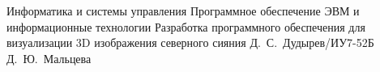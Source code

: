 


	\makecourseworktitle
    {Информатика и системы управления} %
    {Программное обеспечение ЭВМ и информационные технологии} %
    {Разработка программного обеспечения для визуализации 3D изображения северного сияния} %
    {Д.~С.~Дудырев/ИУ7-52Б} %
    {Д.~Ю.~Мальцева} %
	{}

%	
	
	\setcounter{page}{4}
	\def\contentsname{\begin{center}\Large СОДЕРЖАНИЕ\end{center}}
	\tableofcontents

	
	
	

